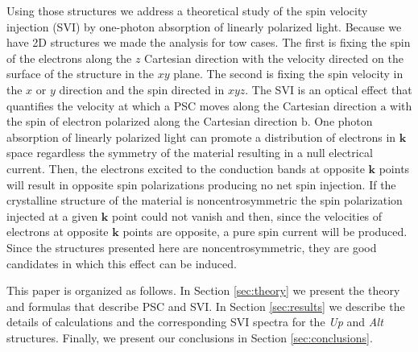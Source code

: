 \documentclass[prb,11pt,tightenlines,twocolumn,aps]{revtex4-1}
\begin{document}
Using those structures we address a theoretical study of the spin velocity
injection (SVI) by one-photon absorption of linearly polarized light.
% 
{
% 
Because we have 2D structures we made the analysis for tow cases. The first is
fixing the spin of the electrons along the $z$ Cartesian direction with the
velocity directed on the surface of the structure in the $xy$ plane. The second
is fixing the spin velocity in the $x$ or $y$ direction and the spin directed
in $xyz$.}
% 
The SVI is an optical effect that quantifies the velocity at which a PSC moves
along the Cartesian direction $\mathrm{a}$ with the spin of electron polarized
along the Cartesian direction $\mathrm{b}$. One photon absorption of linearly
polarized light can promote a distribution of electrons in $\mathbf{k}$ space
regardless the symmetry of the material resulting in a null electrical current.
Then, the electrons excited to the conduction bands at opposite $\mathbf{k}$
points will result in opposite spin polarizations producing no net spin
injection.\cite{bhatPRL05} If the crystalline structure of the material is
noncentrosymmetric the spin polarization injected at a given $\mathbf{k}$ point
could not vanish\cite{alvaradoPRL85, schmiedeskampPRL88} 
% 
{
% 
and then, since the velocities of electrons at opposite $\mathbf{k}$ points are
opposite, a pure spin current will be produced. Since the structures presented
here are noncentrosymmetric, they are good candidates in which this effect can
be induced.}

This paper is organized as follows. In Section \ref{sec:theory} we present the
theory and formulas that describe PSC and SVI. In Section \ref{sec:results} we
describe the details of calculations and the corresponding SVI spectra for the
\emph{Up} and \emph{Alt} structures. Finally, we present our conclusions in
Section \ref{sec:conclusions}.


\end{document}
